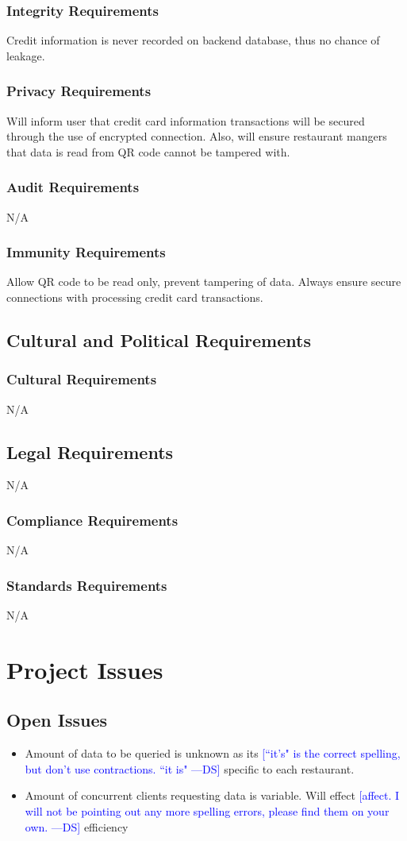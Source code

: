 \documentclass[12pt, titlepage]{article}
\newcommand{\authornote}[3]{\textcolor{#1}{[#3 ---#2]}}
\newcommand{\authornote}[3]{}
\newcommand{\ds}[1]{\authornote{blue}{DS}{#1}}
\begin{document}
\subsubsection{Integrity Requirements}
Credit information is never recorded on backend database, thus no chance of leakage.
\subsubsection{Privacy Requirements}
Will inform user that credit card information transactions will be secured through the use of encrypted connection. Also, will ensure restaurant mangers that data is read from QR code cannot be tampered with.
\subsubsection{Audit Requirements}
N/A
\subsubsection{Immunity Requirements}
Allow QR code to be read only, prevent tampering of data. 	Always ensure secure connections with processing credit card transactions.
\subsection{Cultural and Political Requirements}
\subsubsection{Cultural Requirements}
N/A
\subsection{Legal Requirements}
N/A
\subsubsection{Compliance Requirements}
N/A
\subsubsection{Standards Requirements}
N/A

\section{Project Issues}
\subsection{Open Issues}
\begin{itemize}
\item Amount of data to be queried is unknown as its \ds{``it's" is the correct spelling, but don't use contractions. ``it is"} specific to each restaurant.
\item Amount of concurrent clients requesting data is variable. Will effect \ds{affect. I will not be pointing out any more spelling errors, please find them on your own.} efficiency
\end{itemize}
\end{document}
